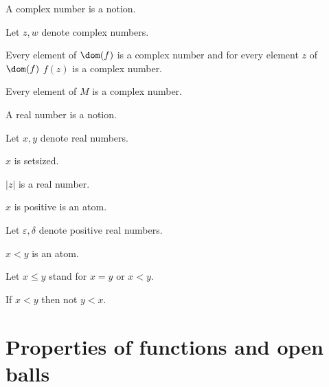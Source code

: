 \documentclass{article}
\begin{document}
  \begin{forthel}
    \begin{signature}
      A complex number is a notion.
    \end{signature}

    Let $z, w$ denote complex numbers.

    \begin{axiom}
      Every element of $\dom(f)$ is a complex number and for every element $z$ of $\dom(f)$ $f(z)$ is a complex number.
    \end{axiom}

    \begin{axiom}
      Every element of $M$ is a complex number.
    \end{axiom}

    \begin{signature}
      A real number is a notion.
    \end{signature}

    Let $x,y$ denote real numbers.

    \begin{axiom}
      $x$ is setsized.
    \end{axiom}

    \begin{signature}
      $|z|$ is a real number.
    \end{signature}

    \begin{signature}
      $x$ is positive is an atom.
    \end{signature}

    Let $\varepsilon, \delta$ denote positive real numbers.

    \begin{signature}
      $x < y$ is an atom.
    \end{signature}

    Let $x \leq y$ stand for $x = y$ or $x < y$.

    \begin{axiom}
      If $x < y$ then not $y < x$.
    \end{axiom}
  \end{forthel}

  \section{Properties of functions and open balls}
\end{document}
